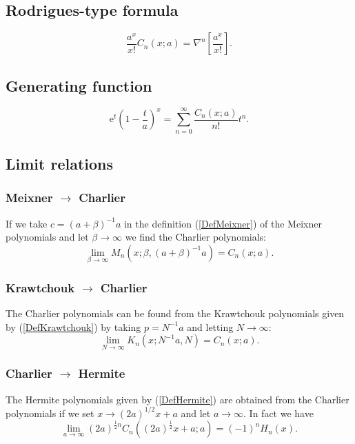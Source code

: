 \documentclass[envcountchap,graybox]{svmono}
\newcounter{rom}
\newcommand{\e}{\textrm{e}}
\begin{document}
\subsection*{Rodrigues-type formula}
\begin{equation}
\label{RodCharlier}
\frac{a^x}{x!}C_n(x;a)=\nabla^n\left[\frac{a^x}{x!}\right].
\end{equation}

\subsection*{Generating function}
\begin{equation}
\label{GenCharlier}
\e^t\left(1-\frac{t}{a}\right)^x=\sum_{n=0}^{\infty}\frac{C_n(x;a)}{n!}t^n.
\end{equation}

\subsection*{Limit relations}

\subsubsection*{Meixner $\rightarrow$ Charlier}
If we take $c=(a+\beta)^{-1}a$ in the definition (\ref{DefMeixner}) of the Meixner polynomials
and let $\beta\rightarrow\infty$ we find the Charlier polynomials:
$$\lim_{\beta\rightarrow\infty}M_n(x;\beta,(a+\beta)^{-1}a)=C_n(x;a).$$

\subsubsection*{Krawtchouk $\rightarrow$ Charlier}
The Charlier polynomials can be found from the Krawtchouk polynomials given by
(\ref{DefKrawtchouk}) by taking $p=N^{-1}a$ and letting $N\rightarrow\infty$:
$$\lim_{N\rightarrow\infty}K_n(x;N^{-1}a,N)=C_n(x;a).$$

\subsubsection*{Charlier $\rightarrow$ Hermite}
The Hermite polynomials given by (\ref{DefHermite}) are obtained from the Charlier polynomials
if we set $x\rightarrow (2a)^{1/2}x+a$ and let $a\rightarrow\infty$. In fact we have
\begin{equation}
\lim_{a\rightarrow\infty}
(2a)^{\frac{1}{2}n}C_n((2a)^{\frac{1}{2}}x+a;a)=(-1)^nH_n(x).
\end{equation}
\end{document}
